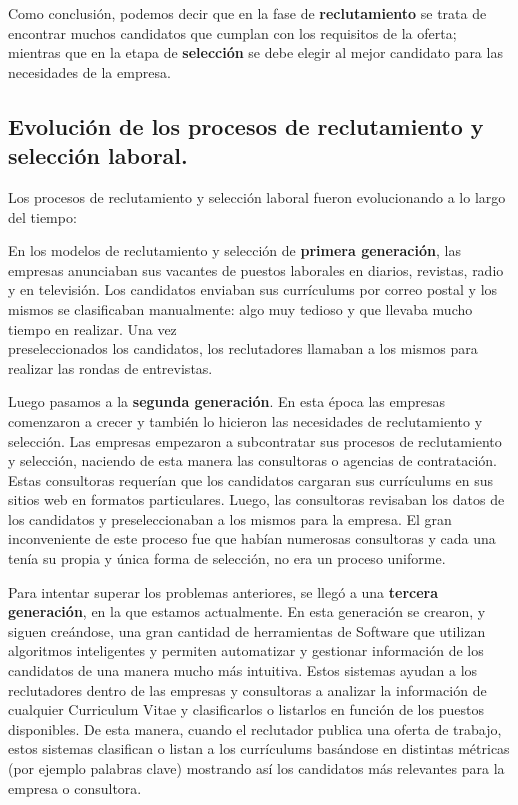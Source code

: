 \documentclass[12pt,a4paper]{article}
\begin{document}
\begin{sloppypar}
Como conclusión, podemos decir que en la fase de \textbf{reclutamiento} se trata de encontrar muchos candidatos que cumplan con los requisitos de la oferta; mientras que en la etapa de \textbf{selección} se debe elegir al mejor candidato para las necesidades de la empresa. 

\cleardoublepage    %

\subsection{Evolución de los procesos de reclutamiento y selección laboral.}
Los procesos de reclutamiento y selección laboral fueron evolucionando a lo largo del tiempo\cite{trabajos_relacionados_10}:

En los modelos de reclutamiento y selección de \textbf{primera generación}, las empresas anunciaban sus vacantes de puestos laborales en diarios, revistas, radio y en televisión. Los candidatos enviaban sus currículums por correo postal y los mismos se clasificaban manualmente: algo muy tedioso y que llevaba mucho tiempo en realizar. Una vez \\ preseleccionados los candidatos, los reclutadores llamaban a los mismos para realizar las rondas de entrevistas. 

Luego pasamos a la \textbf{segunda generación}. En esta época las empresas comenzaron a crecer y también lo hicieron las necesidades de reclutamiento y selección. Las empresas empezaron a subcontratar sus procesos de reclutamiento y selección, naciendo de esta manera las consultoras o agencias de contratación. Estas consultoras requerían que los candidatos cargaran sus currículums en sus sitios web en formatos particulares. Luego, las consultoras revisaban los datos de los candidatos y preseleccionaban a los mismos para la empresa. El gran inconveniente de este proceso fue que habían numerosas consultoras y cada una tenía su propia y única forma de selección, no era un proceso uniforme.

Para intentar superar los problemas anteriores, se llegó a una \textbf{tercera generación}, en la que estamos actualmente. En esta generación se crearon, y siguen creándose, una gran cantidad de herramientas de Software que utilizan algoritmos inteligentes y permiten automatizar y gestionar información de los candidatos de una manera mucho más intuitiva. Estos sistemas ayudan a los reclutadores dentro de las empresas y consultoras a analizar la información de cualquier Curriculum Vitae y clasificarlos o listarlos en función de los puestos disponibles. De esta manera, cuando el reclutador publica una oferta de trabajo, estos sistemas clasifican o listan a los currículums basándose en distintas métricas (por ejemplo palabras clave) mostrando así los candidatos más relevantes para la empresa o consultora.


\end{sloppypar}
\end{document}
